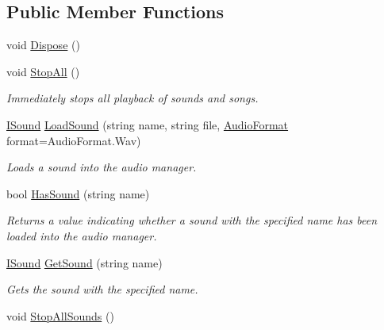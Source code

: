 \subsection*{Public Member Functions}
\begin{DoxyCompactItemize}
\item 
void \hyperlink{class_tri_devs_1_1_tri_engine2_d_1_1_audio_1_1_null_audio_manager_acdc195eb5458a1fa19cb75772959bafa}{Dispose} ()
\item 
void \hyperlink{class_tri_devs_1_1_tri_engine2_d_1_1_audio_1_1_null_audio_manager_a47beada5aec49e38131770e0c2192358}{Stop\-All} ()
\begin{DoxyCompactList}\small\item\em Immediately stops all playback of sounds and songs. \end{DoxyCompactList}\item 
\hyperlink{interface_tri_devs_1_1_tri_engine2_d_1_1_audio_1_1_i_sound}{I\-Sound} \hyperlink{class_tri_devs_1_1_tri_engine2_d_1_1_audio_1_1_null_audio_manager_a274395fd2c2834c900b18b1e62294164}{Load\-Sound} (string name, string file, \hyperlink{namespace_tri_devs_1_1_tri_engine2_d_1_1_audio_ae238794863562d9b6204219dd29019ff}{Audio\-Format} format=Audio\-Format.\-Wav)
\begin{DoxyCompactList}\small\item\em Loads a sound into the audio manager. \end{DoxyCompactList}\item 
bool \hyperlink{class_tri_devs_1_1_tri_engine2_d_1_1_audio_1_1_null_audio_manager_a0163d0ac959a49d6760f46f42f018c6a}{Has\-Sound} (string name)
\begin{DoxyCompactList}\small\item\em Returns a value indicating whether a sound with the specified name has been loaded into the audio manager. \end{DoxyCompactList}\item 
\hyperlink{interface_tri_devs_1_1_tri_engine2_d_1_1_audio_1_1_i_sound}{I\-Sound} \hyperlink{class_tri_devs_1_1_tri_engine2_d_1_1_audio_1_1_null_audio_manager_a0315c552a1754b41239b00fd4c11f94e}{Get\-Sound} (string name)
\begin{DoxyCompactList}\small\item\em Gets the sound with the specified name. \end{DoxyCompactList}\item 
void \hyperlink{class_tri_devs_1_1_tri_engine2_d_1_1_audio_1_1_null_audio_manager_a205cfd3f6ec1efecb65beeb9a0482b4d}{Stop\-All\-Sounds} ()

\end{DoxyCompactItemize}

